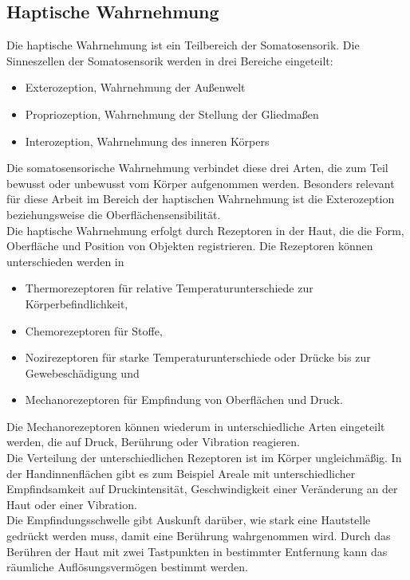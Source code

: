 \subsection{Haptische Wahrnehmung}
Die haptische Wahrnehmung ist ein Teilbereich der Somatosensorik. Die Sinneszellen der Somatosensorik werden in drei Bereiche eingeteilt:
\begin{itemize}
	\item Exterozeption, Wahrnehmung der Außenwelt
	\item Propriozeption, Wahrnehmung der Stellung der Gliedmaßen
	\item Interozeption, Wahrnehmung des inneren Körpers
\end{itemize}
Die somatosensorische Wahrnehmung verbindet diese drei Arten, die zum Teil bewusst oder unbewusst vom Körper aufgenommen werden. Besonders relevant für diese Arbeit im Bereich der haptischen Wahrnehmung ist die Exterozeption beziehungsweise die Oberflächensensibilität. \cite[Vgl. Seite 26]{Sprenger.2020}\\
Die haptische Wahrnehmung erfolgt durch Rezeptoren in der Haut, die die Form, Oberfläche und Position von Objekten registrieren. Die Rezeptoren können unterschieden werden in
\begin{itemize}
	\item Thermorezeptoren für relative Temperaturunterschiede zur Körperbefindlichkeit, 
	\item Chemorezeptoren für Stoffe,
	\item Nozirezeptoren für starke Temperaturunterschiede oder Drücke bis zur Gewebeschädigung und
	\item Mechanorezeptoren für Empfindung von Oberflächen und Druck.
\end{itemize}
Die Mechanorezeptoren können wiederum in unterschiedliche Arten eingeteilt werden, die auf Druck, Berührung oder Vibration reagieren. \cite[Vgl. Seite 26 f.]{Sprenger.2020} \\
Die Verteilung der unterschiedlichen Rezeptoren ist im Körper ungleichmäßig. In der Handinnenflächen gibt es zum Beispiel Areale mit unterschiedlicher Empfindsamkeit \glqq auf Druckintensität, Geschwindigkeit einer Veränderung an der Haut oder einer Vibration. \grqq{} \cite[Seite 29]{Sprenger.2020}\\
Die Empfindungsschwelle gibt Auskunft darüber, wie stark eine Hautstelle gedrückt werden muss, damit eine Berührung wahrgenommen wird. Durch das Berühren der Haut mit zwei Tastpunkten in bestimmter Entfernung kann das räumliche Auflösungsvermögen bestimmt werden. \cite[Vgl. Seite 28]{Sprenger.2020}\\
